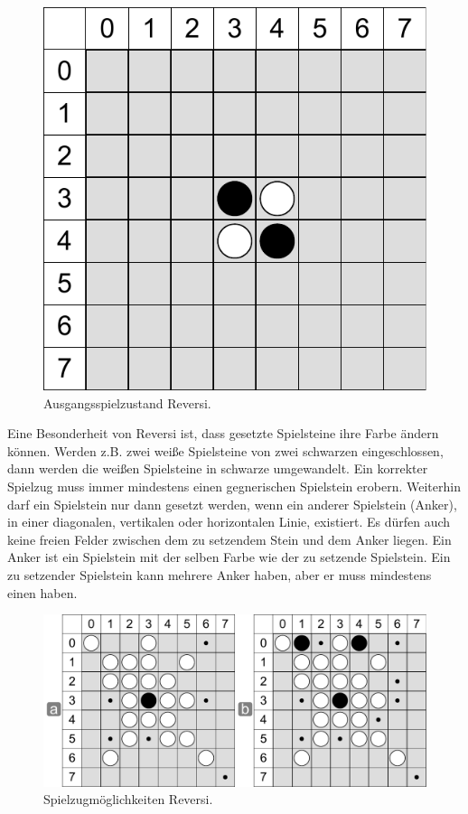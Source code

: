 \begin{figure}[!htbp]
  \centering
  \includegraphics[scale=0.5]{inhalt/abbildungen/ausgangssituation_reversi.pdf}
  \caption{Ausgangsspielzustand Reversi.}
  \label{fig:ausgangssituation_reversi}
\end{figure}



Eine Besonderheit von Reversi ist, dass gesetzte Spielsteine ihre Farbe ändern können. Werden z.B. zwei weiße Spielsteine von zwei schwarzen eingeschlossen, dann werden die weißen Spielsteine in schwarze umgewandelt. Ein korrekter Spielzug muss immer mindestens einen gegnerischen Spielstein erobern. Weiterhin  darf ein Spielstein nur dann gesetzt werden, wenn ein anderer Spielstein (Anker), in einer diagonalen, vertikalen oder horizontalen Linie, existiert. Es dürfen auch keine freien Felder zwischen dem zu setzendem Stein und dem Anker liegen. Ein Anker ist ein Spielstein mit der selben Farbe wie der zu setzende Spielstein. Ein zu setzender Spielstein kann mehrere Anker haben, aber er muss mindestens einen haben.\\

\begin{figure}[!htbp]
  \centering
  \includegraphics[scale=0.5]{inhalt/abbildungen/zuege_schwarz_reversi.pdf}
  \caption{Spielzugmöglichkeiten Reversi.}
  \label{fig:zuege_schwarz_reversi}
\end{figure}

